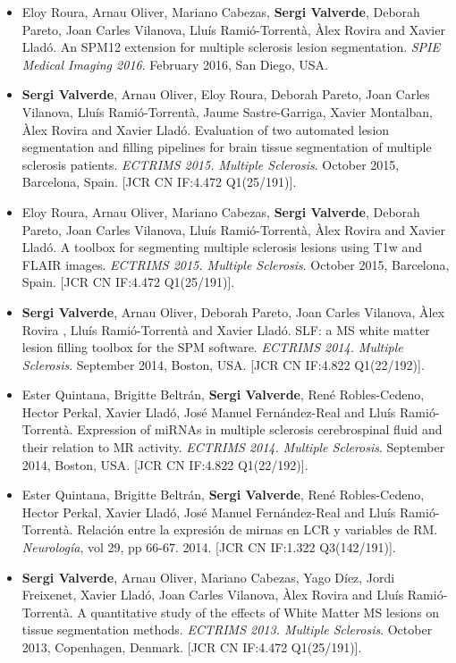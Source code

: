 \begin{itemize}
\item Eloy Roura, Arnau Oliver, Mariano Cabezas, \textbf{Sergi Valverde}, Deborah Pareto, Joan Carles Vilanova, Llu\'{i}s Rami\'{o}-Torrent\`{a}, \`{A}lex Rovira and Xavier Llad\'{o}. An SPM12 extension for multiple sclerosis lesion segmentation. \textit{SPIE Medical Imaging 2016}. February 2016, San Diego, USA.

\item \textbf{Sergi Valverde}, Arnau Oliver, Eloy Roura, Deborah Pareto, Joan Carles Vilanova, Llu\'{i}s Rami\'{o}-Torrent\`{a}, Jaume Sastre-Garriga, Xavier Montalban, \`{A}lex Rovira and Xavier Llad\'{o}. Evaluation of two automated lesion segmentation and filling pipelines for brain tissue segmentation of multiple sclerosis patients. \textit{ECTRIMS 2015. Multiple Sclerosis}. October 2015, Barcelona, Spain. [JCR CN IF:4.472 Q1(25/191)].

\item Eloy Roura, Arnau Oliver, Mariano Cabezas, \textbf{Sergi Valverde}, Deborah Pareto, Joan Carles Vilanova, Llu\'{i}s Rami\'{o}-Torrent\`{a}, \`{A}lex Rovira and Xavier Llad\'{o}. A toolbox for segmenting multiple sclerosis lesions using T1w and FLAIR images. \textit{ECTRIMS 2015. Multiple Sclerosis}. October 2015, Barcelona, Spain. [JCR CN IF:4.472 Q1(25/191)].

\item \textbf{Sergi Valverde}, Arnau Oliver, Deborah Pareto, Joan Carles Vilanova, \`{A}lex Rovira , Llu\'{i}s Rami\'{o}-Torrent\`{a} and Xavier Llad\'{o}.
SLF: a MS white matter lesion filling toolbox for the SPM software. \textit{ECTRIMS 2014. Multiple Sclerosis}. September 2014, Boston, USA. [JCR CN IF:4.822 Q1(22/192)].

\item Ester Quintana, Brigitte Beltr\'{a}n, \textbf{Sergi Valverde}, Ren\'{e} Robles-Cedeno, Hector Perkal, Xavier  Llad\'{o}, Jos\'{e} Manuel Fern\'{a}ndez-Real and Llu\'{i}s Rami\'{o}-Torrent\`{a}. Expression of miRNAs in multiple sclerosis cerebrospinal fluid and their relation to MR activity. \textit{ECTRIMS 2014. Multiple Sclerosis}. September 2014, Boston, USA. [JCR CN IF:4.822 Q1(22/192)].

\item  Ester Quintana, Brigitte Beltr\'{a}n, \textbf{Sergi Valverde}, Ren\'{e} Robles-Cedeno, Hector Perkal, Xavier  Llad\'{o}, Jos\'{e} Manuel Fern\'{a}ndez-Real and Llu\'{i}s Rami\'{o}-Torrent\`{a}. Relaci\'{o}n entre la expresi\'{o}n de mirnas en LCR y variables de RM. \textit{Neurolog\'{i}a}, vol 29, pp 66-67. 2014. [JCR CN IF:1.322 Q3(142/191)].

\item \textbf{Sergi Valverde}, Arnau Oliver, Mariano Cabezas, Yago D\'{i}ez, Jordi Freixenet, Xavier Llad\'{o}, Joan Carles Vilanova, \`{A}lex Rovira and Llu\'{i}s Rami\'{o}-Torrent\`{a}. A quantitative study of the effects of White Matter MS lesions on tissue segmentation methods. \textit{ECTRIMS 2013. Multiple Sclerosis}. October 2013, Copenhagen, Denmark. [JCR CN IF:4.472 Q1(25/191)].


\end{itemize}



